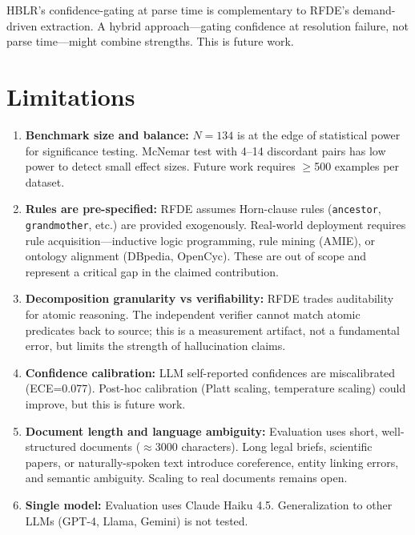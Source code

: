 \documentclass[11pt,letterpaper]{article}
\begin{document}
HBLR's confidence-gating at parse time is complementary to RFDE's demand-driven extraction. A hybrid approach---gating confidence at resolution failure, not parse time---might combine strengths. This is future work.

\section{Limitations}

\begin{enumerate}
  \item \textbf{Benchmark size and balance:} $N=134$ is at the edge of statistical power for significance testing. McNemar test with 4--14 discordant pairs has low power to detect small effect sizes. Future work requires $\geq$500 examples per dataset.

  \item \textbf{Rules are pre-specified:} RFDE assumes Horn-clause rules (\texttt{ancestor}, \texttt{grandmother}, etc.) are provided exogenously. Real-world deployment requires rule acquisition---inductive logic programming, rule mining (AMIE), or ontology alignment (DBpedia, OpenCyc). These are out of scope and represent a critical gap in the claimed contribution.

  \item \textbf{Decomposition granularity vs verifiability:} RFDE trades auditability for atomic reasoning. The independent verifier cannot match atomic predicates back to source; this is a measurement artifact, not a fundamental error, but limits the strength of hallucination claims.

  \item \textbf{Confidence calibration:} LLM self-reported confidences are miscalibrated (ECE=0.077). Post-hoc calibration (Platt scaling, temperature scaling) could improve, but this is future work.

  \item \textbf{Document length and language ambiguity:} Evaluation uses short, well-structured documents ($\approx$3000 characters). Long legal briefs, scientific papers, or naturally-spoken text introduce coreference, entity linking errors, and semantic ambiguity. Scaling to real documents remains open.

  \item \textbf{Single model:} Evaluation uses Claude Haiku 4.5. Generalization to other LLMs (GPT-4, Llama, Gemini) is not tested.
\end{enumerate}
\end{document}
